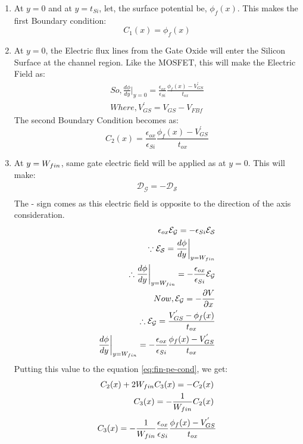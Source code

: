 \documentclass[a4paper]{article}
\begin{document}
\begin{enumerate}
\item At $y=0$ and at $y=t_{Si}$, let, the surface potential be, $\phi_f(x)$. This makes the first Boundary condition:
  \begin{equation}
    \label{eq:fin-cond-1}
    C_1(x)=\phi_f(x)
  \end{equation}
\item At $y=0$, the Electric flux lines from the Gate Oxide will enter the Silicon Surface at the channel region. Like the MOSFET, this will make the Electric Field as:
  \begin{align*}
    So, \frac{d\phi}{dy} \bigg\vert_{y=0} = \frac {\epsilon_{ox}} {\epsilon_{Si}} \frac{\phi_f(x) - V_{GS}^{'}}{t_{ox}}\\
    Where, V_{GS}^{'} = V_{GS} - V_{FBf}
  \end{align*}
  The second Boundary Condition becomes as:
  \begin{equation}
    \label{eq:fin-cond-2}
    C_2(x)=\frac {\epsilon_{ox}} {\epsilon_{Si}} \frac{\phi_f(x) - V_{GS}^{'}}{t_{ox}}
  \end{equation}
\item At $y=W_{fin}$, same gate electric field will be applied as at $y=0$. This will make:
  \begin{align*}
    \mathcal{D_{G}} = - \mathcal{D_{S}}\\
  \end{align*}
  The - sign comes as this electric field is opposite to the direction of the axis consideration.
  \begin{align*}
    \epsilon_{ox} \mathcal{E_{G}} = - \epsilon_{Si} \mathcal{E_{S}}\\
    \because \mathcal{E_{S}} = \frac{d\phi}{dy} \bigg\vert_{y=W_{fin}}\\
    \therefore \frac{d\phi}{dy} \bigg\vert_{y=W_{fin}} = - \frac {\epsilon_{ox}} {\epsilon_{Si}} \mathcal{E_{G}}\\
    Now, \mathcal{E_{G}} = - \frac{\partial V}{\partial x}\\
    \therefore \mathcal{E_{G}} = \frac{V_{GS}^{'} - \phi_f(x)}{t_{ox}}\\
    \frac{d\phi}{dy} \bigg\vert_{y=W_{fin}} = - \frac {\epsilon_{ox}} {\epsilon_{Si}} \frac{\phi_f(x) - V_{GS}^{'}}{t_{ox}}
  \end{align*}
  Putting this value to the equation \ref{eq:fin-pe-cond}, we get:
  \begin{align*}
    C_2(x) + 2W_{fin} C_3(x) = - C_2(x)\\
    C_3(x) = - \frac{1}{W_{fin}} C_2(x)
  \end{align*}
  \begin{equation}
    \label{eq:fin-cond-3}
    C_3(x) = - \frac{1}{W_{fin}} \frac {\epsilon_{ox}} {\epsilon_{Si}} \frac{\phi_f(x) - V_{GS}^{'}}{t_{ox}}
  \end{equation}
\end{enumerate}
\end{document}
